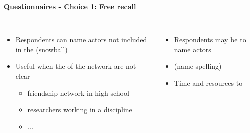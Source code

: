 \documentclass[8pt]{beamer}
\begin{document}
\begin{frame}
\frametitle{\insertsection}
\framesubtitle{Questionnaires - Choice 1: Free recall}

\begin{columns}[t]

{\color{dkgreen}{Advantages}}
\begin{itemize}
\item Respondents can name actors not included in the {\color{dkgreen}{initial delineation of the network boundaries}} (snowball)
\item Useful when the {\color{dkgreen}{boundaries}} of the network are not clear
    \begin{itemize}
    \item friendship network in high school
    \item researchers working in a discipline
    \item ...
    \end{itemize}
\end{itemize}


{\color{red}{Limitations}}
\begin{itemize}
\item Respondents may be {\color{red}{unwilling or uncomfortable}} to name actors
\item {\color{red}{Data cleaning}} (name spelling)
\item Time and resources to {\color{red}{contact `snowballed' actors}}
\end{itemize}

\end{columns}

\end{frame}

\end{document}
